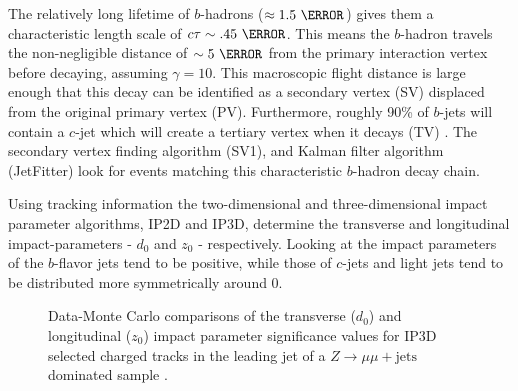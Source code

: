 The relatively long lifetime of $b$-hadrons ($\approx 1.5~\ps$) gives them a
characteristic length scale of  $c\tau \sim .45~\mm$. This means the $b$-hadron
travels the non-negligible distance of $\sim 5~\mm$  from the primary
interaction vertex before decaying, assuming $\gamma = 10$.  This macroscopic
flight distance is large enough that this decay can be identified as a
secondary vertex (SV) displaced from the original primary vertex (PV).
Furthermore, roughly 90\% of $b$-jets will contain a $c$-jet which will create
a tertiary vertex when it decays (TV) \cite{Chisholm:bjet}.  The secondary
vertex finding algorithm (SV1), and Kalman filter algorithm (JetFitter) look
for events matching this characteristic $b$-hadron decay chain. 

Using tracking information the two-dimensional and three-dimensional impact
parameter algorithms, IP2D and IP3D, determine the transverse and longitudinal
impact-parameters - $d_{\text{0}}$ and $z_{\text{0}}$ - respectively. Looking
at  the impact parameters of
the $b$-flavor jets tend to be positive, while those of $c$-jets and light jets
tend to be distributed more symmetrically around 0.

\begin{figure}[!htbp]
  \centering
   \hfill

  \caption{Data-Monte Carlo comparisons of the
transverse ($d_{0}$) and longitudinal ($z_{0}$) impact parameter significance
values for IP3D selected charged tracks in the leading jet of a $Z\to\mu\mu +
\text{jets}$ dominated sample \cite{Chisholm:bjet}.}
  \label{sec:objects:impact_parameters}
\end{figure}

